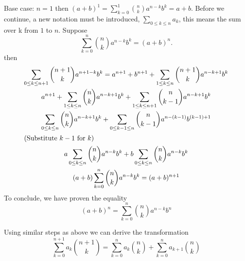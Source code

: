 \begin{problem}
{	\item Base case: $n=1$ then $(a+b)^1=\sum_{k=0}^{1}\binom{n}{k}a^{n-k}b^k =a+b$. Before we continue, a new notation must be introduced, $\sum_{0\leq k \leq n}a_k$, this means the sum over k from $1$ to $n$. Suppose $$\sum_{k=0}^{n}\binom{n}{k}a^{n-k}b^k=(a+b)^n.$$
	then 
	\begin{gather*}
		\sum_{0\leq k \leq n+1}\binom{n+1}{k}a^{n+1-k}b^k = a^{n+1}+b^{n+1}+\sum_{1\leq k\leq n}\binom{n+1}{k}a^{n-k+1}b^k \\
		a^{n+1}+\sum_{1\leq k\leq n}\binom{n}{k}a^{n-k+1}b^k+\sum_{1\leq k\leq n+1}\binom{n}{k-1}a^{n-k+1}b^k \\
		\sum_{0\leq k\leq n}\binom{n}{k}a^{n-k+1}b^k+\sum_{0\leq k-1\leq n}\binom{n}{k-1}a^{n-(k-1)}b^{(k-1)+1} \\
		\intertext{(Substitute $k-1$ for $k$)}
		a\sum_{0\leq k\leq n}\binom{n}{k}a^{n-k}b^k+b\sum_{0\leq k \leq n}\binom{n}{k}a^{n-k}b^k \\
		(a+b)\sum_{k=0}^{n}\binom{n}{k}a^{n-k}b^k=(a+b)^{n+1}
	\end{gather*}
	To conclude, we have proven the equality $$(a+b)^n=\sum_{k=0}^{n}\binom{n}{k}a^{n-k}b^n$$
	
	\item Using similar steps as above we can derive the transformation $$\sum_{k=0}^{n+1}a_k\binom{n+1}{k}=\sum_{k=0}^{n}a_k\binom{n}{k}+\sum_{k=0}^{n}a_{k+1}\binom{n}{k}$$
	
		}
\end{problem}
